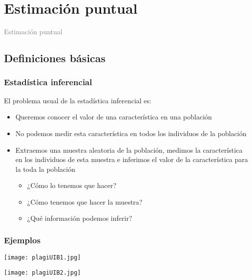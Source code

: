 \documentclass[12pt,t]{beamer}\usepackage[]{graphicx}\usepackage[]{color}
\title[\red{Matemáticas III GINF}]{}
\author[]{}
\date{}
\newcommand{\gray}[1]{\textcolor{gray}{#1}}
\renewcommand{\emph}[1]{{\color{red}#1}}
\theoremstyle{plain}
\theoremstyle{definition}
\begin{document}
\beamertemplatedotitem

\lstset{breaklines=true}
\lstset{basicstyle=\ttfamily}


\section{Estimación puntual}

\begin{frame}
\vfill
\begin{center}
\gray{\LARGE Estimación puntual}
\end{center}
\vfill
\end{frame}






\subsection{Definiciones básicas}


\begin{frame}
\frametitle{Estadística inferencial}

El problema usual de la \emph{estadística inferencial} es:

\begin{itemize}

\item Queremos conocer el valor de una característica en una población
\medskip

\item No podemos medir esta característica en todos los individuos de la población
\medskip

\item Extraemos una muestra  aleatoria de la población,  medimos la característica en los  individuos de esta muestra e  \emph{inferimos} el valor de la característica para la toda la población

\begin{itemize}
\item ¿Cómo lo tenemos que hacer?
\item ¿Cómo tenemos que hacer la muestra?
\item ¿Qué información podemos inferir?
\end{itemize}
\end{itemize}
\end{frame}



\begin{frame}
\frametitle{Ejemplos}

\begin{center}
\hspace*{-0.5cm}
\texttt{[image: plagiUIB1.jpg]}\bigskip

\hspace*{-0.5cm}\texttt{[image: plagiUIB2.jpg]}
\end{center}
\end{frame}
\end{document}
